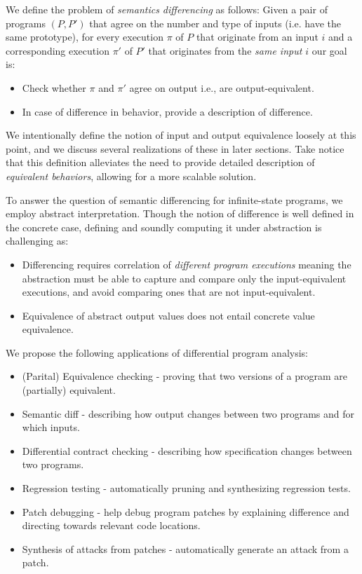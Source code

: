 We define the problem of \emph{semantics differencing} as follows: Given a pair of programs $(P,P')$ that agree on the number and type of inputs (i.e. have the same prototype), for every execution $\pi$ of $P$ that originate from an input $i$ and a corresponding execution $\pi'$ of $P'$ that originates from the \emph{same input $i$} our goal is:
\begin{itemize}
\item Check whether $\pi$ and $\pi'$ agree on output i.e., are output-equivalent.
\item In case of difference in behavior, provide a description of difference.
\end{itemize}
We intentionally define the notion of input and output equivalence loosely at this point, and we discuss several realizations of these in later sections. Take notice that this definition alleviates the need to provide detailed description of \emph{equivalent behaviors}, allowing for a more scalable solution.

To answer the question of semantic differencing for infinite-state programs, we employ abstract interpretation. Though the notion of difference is well defined in the concrete case, defining and soundly computing it under abstraction is challenging as:
\begin{itemize}
\item Differencing requires correlation of \emph{different program executions} meaning the abstraction must be able to capture and compare only the input-equivalent executions, and avoid comparing ones that are not input-equivalent.
\item Equivalence of abstract output values does not entail concrete value equivalence.
\end{itemize}

We propose the following applications of differential program analysis:
\begin{itemize}
\item (Parital) Equivalence checking - proving that two versions of a program are (partially) equivalent.
\item Semantic diff - describing how output changes between two programs and for which inputs.
\item Differential contract checking - describing how specification changes between two programs.
\item Regression testing - automatically pruning and synthesizing regression tests.
\item Patch debugging - help debug program patches by explaining difference and directing towards relevant code locations.
\item Synthesis of attacks from patches - automatically generate an attack from a patch.
\end{itemize}


